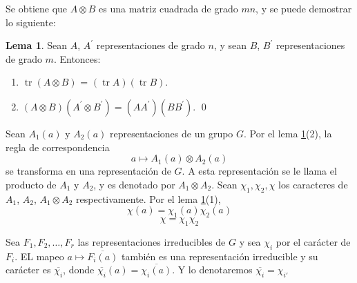 \documentclass[12pt]{book}
\DeclareMathOperator{\tr}{tr}
\theoremstyle{definition}
\newtheorem{lemma}[theorem]{Lema}
\newcounter{in}
\begin{document}
Se obtiene que $A \otimes B$ es una matriz cuadrada de grado $mn$, y se
puede demostrar lo siguiente:
\begin{lemma}
  \label{l6_1}
  Sean $A$, $A^{'}$ representaciones de grado $n$, y sean $B$, $B^{'}$
  representaciones de grado $m$. Entonces:
  \begin{enumerate}
  \item $\tr(A \otimes B)$ = $(\tr A)(\tr B)$.
  \item $(A \otimes B)(A^{'} \otimes B^{'}) = (AA^{'})(BB^{'})$. \qed
  \end{enumerate}
\end{lemma}

Sean $A_{1}(a)$ y $A_{2}(a)$ representaciones de un grupo $G$. Por el lema
\ref{l6_1}(2), la regla de correspondencia
\begin{equation*}
  a \mapsto A_{1}(a) \otimes A_{2}(a)
\end{equation*}
se transforma en una representación de $G$. A esta representación se
le llama el producto de $A_{1}$ y $A_{2}$, y es denotado por
$A_{1} \otimes A_{2}$. Sean $\chi_{1}, \chi_2, \chi$ los caracteres de
$A_{1}$, $A_{2}$, $A_{1} \otimes A_{2}$ respectivamente. Por el lema
\ref{l6_1}(1),
\begin{equation*}
  \chi(a)=\chi_{1}(a) \chi_{2}(a)
\end{equation*}
\begin{equation}
  \label{eq:67}
  \chi = \chi_{1} \chi_{2}
\end{equation}

Sea $F_{1}, F_{2}, \ldots, F_{r}$ las representaciones irreducibles de
$G$ y sea $\chi_{i}$ por el carácter de $F_{i}$. EL mapeo
$a \mapsto \overline{F_{i}(a)}$ también es una representación
irreducible y su carácter es $\overline{\chi_{i}}$, donde
$\overline{\chi_{i}}(a) = \overline{\chi_{i}(a)}$. Y lo denotaremos
$\overline{\chi_{i}}=\chi_{i'}$
\end{document}
